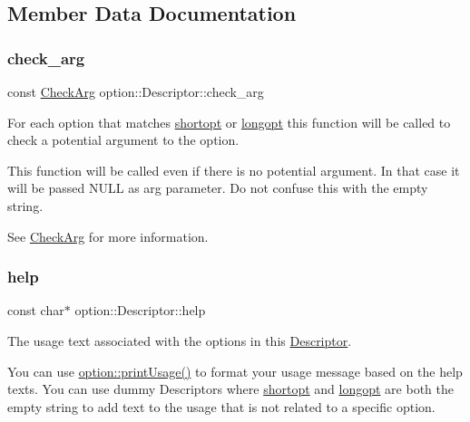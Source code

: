 \subsection{Member Data Documentation}
\mbox{\label{structoption_1_1_descriptor_aa5d675dba0214a4abd73007ff163cc67}} 
\subsubsection{\texorpdfstring{check\+\_\+arg}{check\_arg}}
{\footnotesize\ttfamily const \hyperlink{namespaceoption_a4cdf403efae65e18bf850e2001b12a2a}{Check\+Arg} option\+::\+Descriptor\+::check\+\_\+arg}



For each option that matches \hyperlink{structoption_1_1_descriptor_a0dba4ccca59c19d6ed4081391fca5adb}{shortopt} or \hyperlink{structoption_1_1_descriptor_a470c449dfa894c9bfda2dae026142b4b}{longopt} this function will be called to check a potential argument to the option. 

This function will be called even if there is no potential argument. In that case it will be passed {\ttfamily N\+U\+LL} as {\ttfamily arg} parameter. Do not confuse this with the empty string.

See \hyperlink{namespaceoption_a4cdf403efae65e18bf850e2001b12a2a}{Check\+Arg} for more information. \mbox{\label{structoption_1_1_descriptor_a9045b19311533e1b8a08645d57149c79}} 
\subsubsection{\texorpdfstring{help}{help}}
{\footnotesize\ttfamily const char$\ast$ option\+::\+Descriptor\+::help}



The usage text associated with the options in this \hyperlink{structoption_1_1_descriptor}{Descriptor}. 

You can use \hyperlink{namespaceoption_afc8bb7e040a98a0b33ff1ce9da1be0d1}{option\+::print\+Usage()} to format your usage message based on the {\ttfamily help} texts. You can use dummy Descriptors where \hyperlink{structoption_1_1_descriptor_a0dba4ccca59c19d6ed4081391fca5adb}{shortopt} and \hyperlink{structoption_1_1_descriptor_a470c449dfa894c9bfda2dae026142b4b}{longopt} are both the empty string to add text to the usage that is not related to a specific option.


